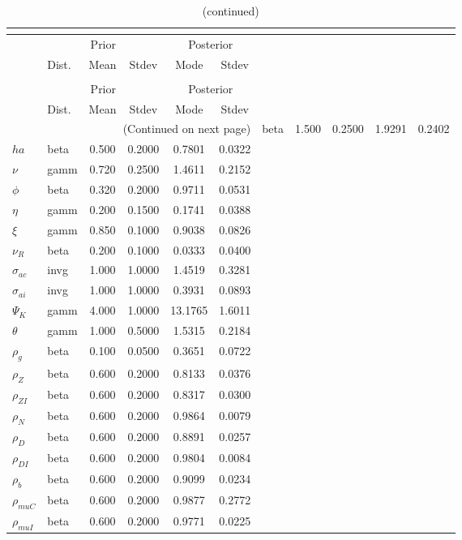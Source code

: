  
\begin{center}
\begin{longtable}{llcccc} 
\caption{Results from posterior maximization (parameters)}\\
 \label{Table:Posterior:1}\\
\toprule 
  & \multicolumn{3}{c}{Prior}  &  \multicolumn{2}{c}{Posterior} \\
  \cmidrule(r{.75em}){2-4} \cmidrule(r{.75em}){5-6}
  & Dist. & Mean  & Stdev & Mode & Stdev \\ 
\midrule \endfirsthead 
\caption{(continued)}\\
 \bottomrule 
  & \multicolumn{3}{c}{Prior}  &  \multicolumn{2}{c}{Posterior} \\
  \cmidrule(r{.75em}){2-4} \cmidrule(r{.75em}){5-6}
  & Dist. & Mean  & Stdev & Mode & Stdev \\ 
\midrule \endhead 
\bottomrule \multicolumn{6}{r}{(Continued on next page)}\endfoot 
\bottomrule\endlastfoot 
${\sigma}$ & beta &   1.500 & 0.2500 &   1.9291 &  0.2402 \\ 
${ha}$ & beta &   0.500 & 0.2000 &   0.7801 &  0.0322 \\ 
$\nu$ & gamm &   0.720 & 0.2500 &   1.4611 &  0.2152 \\ 
${\phi}$ & beta &   0.320 & 0.2000 &   0.9711 &  0.0531 \\ 
${\eta}$ & gamm &   0.200 & 0.1500 &   0.1741 &  0.0388 \\ 
$\xi$ & gamm &   0.850 & 0.1000 &   0.9038 &  0.0826 \\ 
${\nu_R}$ & beta &   0.200 & 0.1000 &   0.0333 &  0.0400 \\ 
${\sigma_{ac}}$ & invg &   1.000 & 1.0000 &   1.4519 &  0.3281 \\ 
${\sigma_{ai}}$ & invg &   1.000 & 1.0000 &   0.3931 &  0.0893 \\ 
${\Psi_{K}}$ & gamm &   4.000 & 1.0000 &  13.1765 &  1.6011 \\ 
${\theta}$ & gamm &   1.000 & 0.5000 &   1.5315 &  0.2184 \\ 
${\rho_g}$ & beta &   0.100 & 0.0500 &   0.3651 &  0.0722 \\ 
${\rho_Z}$ & beta &   0.600 & 0.2000 &   0.8133 &  0.0376 \\ 
${\rho_{ZI}}$ & beta &   0.600 & 0.2000 &   0.8317 &  0.0300 \\ 
${\rho_N}$ & beta &   0.600 & 0.2000 &   0.9864 &  0.0079 \\ 
${\rho_D}$ & beta &   0.600 & 0.2000 &   0.8891 &  0.0257 \\ 
${\rho_{DI}}$ & beta &   0.600 & 0.2000 &   0.9804 &  0.0084 \\ 
${\rho_b}$ & beta &   0.600 & 0.2000 &   0.9099 &  0.0234 \\ 
${\rho_{muC}}$ & beta &   0.600 & 0.2000 &   0.9877 &  0.2772 \\ 
${\rho_{muI}}$ & beta &   0.600 & 0.2000 &   0.9771 &  0.0225 \\ 
\end{longtable}
 \end{center}
